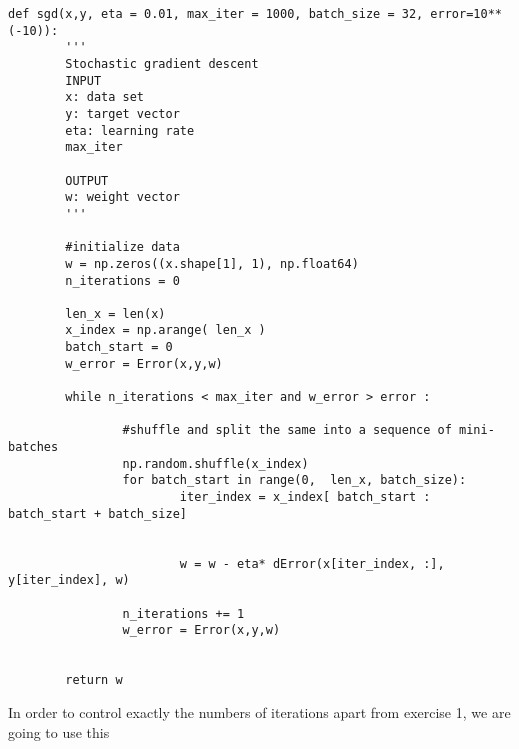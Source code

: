  
  \begin{verbatim}
def sgd(x,y, eta = 0.01, max_iter = 1000, batch_size = 32, error=10**(-10)):
        '''
        Stochastic gradient descent
        INPUT 
        x: data set
        y: target vector
        eta: learning rate
        max_iter 

        OUTPUT 
        w: weight vector
        '''
  
        #initialize data
        w = np.zeros((x.shape[1], 1), np.float64)
        n_iterations = 0

        len_x = len(x)
        x_index = np.arange( len_x )
        batch_start = 0
        w_error = Error(x,y,w)

        while n_iterations < max_iter and w_error > error :
  
                #shuffle and split the same into a sequence of mini-batches
                np.random.shuffle(x_index)
                for batch_start in range(0,  len_x, batch_size):
                        iter_index = x_index[ batch_start : batch_start + batch_size]

        
                        w = w - eta* dError(x[iter_index, :], y[iter_index], w)
        
                n_iterations += 1
                w_error = Error(x,y,w)

   
        return w
      \end{verbatim}

      In order to control exactly the numbers of iterations apart from exercise 1, we are going to use this 

